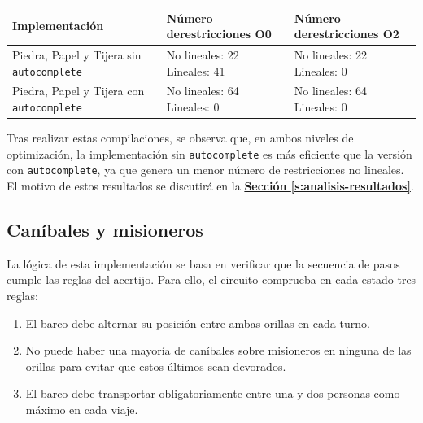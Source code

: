 \documentclass[a4paper,12pt]{report}
\begin{document}
	\vspace{0.2cm}
	\begingroup 
	\renewcommand{\arraystretch}{1.8} 
	\begin{longtable}{|>{\centering\arraybackslash}m{4.5cm}|>{\centering\arraybackslash}m{4.8cm}|>{\centering\arraybackslash}m{4.8cm}|}
		\hline
		\textbf{Implementación} & \textbf{Número de\newline restricciones O0} & \textbf{Número de\newline restricciones O2} \\
		\hline
		
		Piedra, Papel y Tijera sin \texttt{autocomplete} & No lineales: 22 \newline Lineales: 41 & No lineales: 22 \newline Lineales: 0 \\
		\hline
		
		Piedra, Papel y Tijera con \texttt{autocomplete} & No lineales: 64 \newline Lineales: 0 & No lineales: 64 \newline Lineales: 0 \\
		\hline
	\end{longtable}
	\endgroup
	
	\vspace{0.3cm}
	\noindent Tras realizar estas compilaciones, se observa que, en ambos niveles de optimización, la implementación sin \texttt{autocomplete} es más eficiente que la versión con \texttt{autocomplete}, ya que genera un menor número de restricciones no lineales. El motivo de estos resultados se discutirá en la \hyperref[s:analisis-resultados]{\textbf{Sección \ref{s:analisis-resultados}}}.
	
	\subsection{Caníbales y misioneros}
	\vspace{0.2cm}
	\noindent La lógica de esta implementación se basa en verificar que la secuencia de pasos cumple las reglas del acertijo. Para ello, el circuito comprueba en cada estado tres reglas: 
	
	\begin{enumerate}
		\item El barco debe alternar su posición entre ambas orillas en cada turno.
		\item No puede haber una mayoría de caníbales sobre misioneros en ninguna de las orillas para evitar que estos últimos sean devorados.
		\item El barco debe transportar obligatoriamente entre una y dos personas como máximo en cada viaje.
	\end{enumerate}
	
\end{document}
